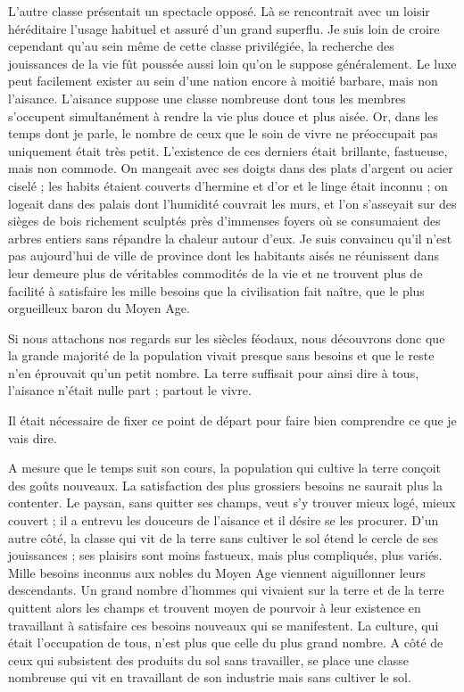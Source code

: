 \documentclass[french,twoside]{book} %
\begin{document}
L'autre classe présentait un spectacle opposé. Là se rencontrait avec un loisir héréditaire l’usage habituel et assuré d’un grand superflu. Je suis loin de croire cependant qu’au sein même de cette classe privilégiée, la recherche des jouissances de la vie fût poussée aussi loin qu’on le suppose généralement. Le luxe peut facilement exister au sein d’une nation encore à moitié barbare, mais non l’aisance. L'aisance suppose une classe nombreuse dont tous les membres s’occupent simultanément à rendre la vie plus douce et plus aisée. Or, dans les temps dont je parle, le nombre de ceux que le soin de vivre ne préoccupait pas uniquement était très petit. L’existence de ces derniers était brillante, fastueuse, mais non commode. On mangeait avec ses doigts dans des plats d’argent ou acier ciselé ; les habits étaient couverts d’hermine et d’or et le linge était inconnu ; on logeait dans des palais dont l’humidité couvrait les murs, et l’on s’asseyait sur des sièges de bois richement sculptés près d’immenses foyers où se consumaient des arbres entiers sans répandre la chaleur autour d’eux. Je suis convaincu qu’il n’est pas aujourd’hui de ville de province dont les habitants aisés ne réunissent dans leur demeure plus de véritables commodités de la vie et ne trouvent plus de facilité à satisfaire les mille besoins que la civilisation fait naître, que le plus orgueilleux baron du Moyen Age.\par
Si nous attachons nos regards sur les siècles féodaux, nous découvrons donc que la grande majorité de la population vivait presque sans besoins et que le reste n’en éprouvait qu’un petit nombre. La terre suffisait pour ainsi dire à tous, l’aisance n’était nulle part ; partout le vivre.\par
Il était nécessaire de fixer ce point de départ pour faire bien comprendre ce que je vais dire.\par
A mesure que le temps suit son cours, la population qui cultive la terre conçoit des goûts nouveaux. La satisfaction des plus grossiers besoins ne saurait plus la contenter. Le paysan, sans quitter ses champs, veut s’y trouver mieux logé, mieux couvert ; il a entrevu les douceurs de l’aisance et il désire se les procurer. D'un autre côté, la classe qui vit de la terre sans cultiver le sol étend le cercle de ses jouissances ; ses plaisirs sont moins fastueux, mais plus compliqués, plus variés. Mille besoins inconnus aux nobles du Moyen Age viennent aiguillonner leurs descendants. Un grand nombre d’hommes qui vivaient sur la terre et de la terre quittent alors les champs et trouvent moyen de pourvoir à leur existence en travaillant à satisfaire ces besoins nouveaux qui se manifestent. La culture, qui était l’occupation de tous, n’est plus que celle du plus grand nombre. A côté de ceux qui subsistent des produits du sol sans travailler, se place une classe nombreuse qui vit en travaillant de son industrie mais sans cultiver le sol.\par
\end{document}
